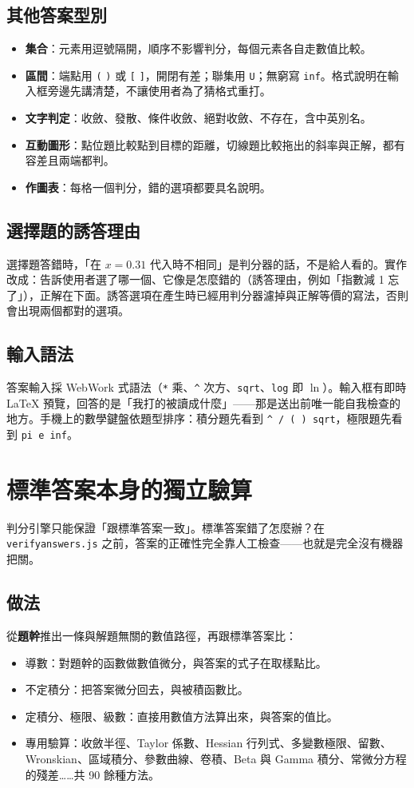 \documentclass[11pt,a4paper,oneside]{report}
\renewcommand{\_}{\ifmmode\origunderscore\else\textunderscore\allowbreak\fi}
\newcommand{\code}[1]{\texttt{#1}}
\newcommand{\file}[1]{\texttt{\small #1}}
\begin{document}
\section{其他答案型別}
\begin{itemize}
  \item \textbf{集合}：元素用逗號隔開，順序不影響判分，每個元素各自走數值比較。
  \item \textbf{區間}：端點用 \code{(} \code{)} 或 \code{[} \code{]}，開閉有差；聯集用 \code{U}；無窮寫 \code{inf}。格式說明在輸入框旁邊先講清楚，不讓使用者為了猜格式重打。
  \item \textbf{文字判定}：收斂、發散、條件收斂、絕對收斂、不存在，含中英別名。
  \item \textbf{互動圖形}：點位題比較點到目標的距離，切線題比較拖出的斜率與正解，都有容差且兩端都判。
  \item \textbf{作圖表}：每格一個判分，錯的選項都要具名說明。
\end{itemize}

\section{選擇題的誘答理由}
選擇題答錯時，「在 $x = 0.31$ 代入時不相同」是判分器的話，不是給人看的。實作改成：告訴使用者選了哪一個、它像是怎麼錯的（誘答理由，例如「指數減 1 忘了」），正解在下面。誘答選項在產生時已經用判分器濾掉與正解等價的寫法，否則會出現兩個都對的選項。

\section{輸入語法}
答案輸入採 WebWork 式語法（\code{*} 乘、\code{\string^} 次方、\code{sqrt}、\code{log} 即 $\ln$）。輸入框有即時 LaTeX 預覽，回答的是「我打的被讀成什麼」——那是送出前唯一能自我檢查的地方。手機上的數學鍵盤依題型排序：積分題先看到 \code{\string^ / ( ) sqrt}，極限題先看到 \code{pi e inf}。

\chapter{標準答案本身的獨立驗算}
判分引擎只能保證「跟標準答案一致」。標準答案錯了怎麼辦？在 \file{verify\_answers.js} 之前，答案的正確性完全靠人工檢查——也就是完全沒有機器把關。

\section{做法}
從\textbf{題幹}推出一條與解題無關的數值路徑，再跟標準答案比：
\begin{itemize}
  \item 導數：對題幹的函數做數值微分，與答案的式子在取樣點比。
  \item 不定積分：把答案微分回去，與被積函數比。
  \item 定積分、極限、級數：直接用數值方法算出來，與答案的值比。
  \item 專用驗算：收斂半徑、Taylor 係數、Hessian 行列式、多變數極限、留數、Wronskian、區域積分、參數曲線、卷積、Beta 與 Gamma 積分、常微分方程的殘差……共 90 餘種方法。
\end{itemize}
\end{document}
